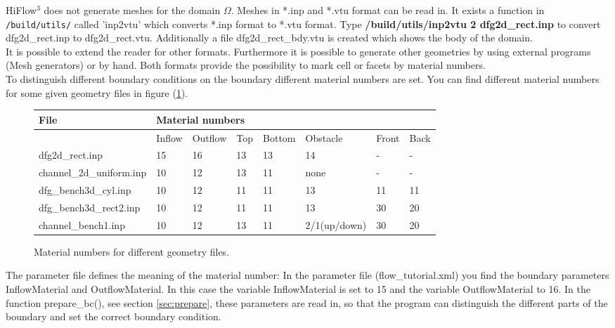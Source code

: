 \documentclass[a4paper, 11pt, twoside]{article}
\begin{document}
HiFlow$^3$ does not generate meshes for the domain $\Omega$. Meshes in *.inp and *.vtu format can be read in. It exists a function in \verb'/build/utils/' called 'inp2vtu' which converts *.inp format to *.vtu format. Type \textbf{/build/utils/inp2vtu 2 dfg2d\_rect.inp} to convert dfg2d\_rect.inp to dfg2d\_rect.vtu. Additionally a file dfg2d\_rect\_bdy.vtu is created which shows the body of the domain.\\
It is possible to extend the reader for other formats.
Furthermore it is possible to generate other geometries by using external programs (Mesh generators) or by hand. 
Both formats provide the possibility to mark cell or facets by material numbers.\\ 
%
To distinguish different boundary conditions on the boundary different material numbers are set. You can find different material numbers for some given geometry files in figure (\ref{materialnumbers}).
\begin{figure}[htb]
  \begin{tabular}{|l|l|l|l|l|l|l|l|}
  \hline
  File & \multicolumn{7}{|l|}{Material numbers} \\
  \hline
  & Inflow & Outflow & Top & Bottom & Obstacle & Front & Back \\
  \hline
  dfg2d\_rect.inp & 15 & 16 & 13 & 13 & 14 & - & - \\
  \hline
  channel\_2d\_uniform.inp & 10 & 12 & 13 & 11 & none & - & - \\
  \hline
  dfg\_bench3d\_cyl.inp & 10 & 12 & 11 & 11 & 13 & 11 & 11 \\
  \hline
  dfg\_bench3d\_rect2.inp & 10 & 12 & 11 & 11 & 13 & 30 & 20 \\
  \hline
  channel\_bench1.inp & 10 & 12 & 13 & 11 & 2/1(up/down) & 30 & 20 \\
  \hline
  \end{tabular}
\caption{Material numbers for different geometry files.}
\label{materialnumbers}
\end{figure}
The parameter file defines the meaning of the material number:
In the parameter file (flow\_tutorial.xml) you find the boundary parameters InflowMaterial and OutflowMaterial. 
In this case the variable InflowMaterial is set to 15 and the variable OutflowMaterial to 16. In the function prepare\_bc(), see section \ref{sec:prepare}, 
these parameters are read in, so that the program can distinguish the different parts of the boundary and 
set the correct boundary condition.\\
\end{document}

